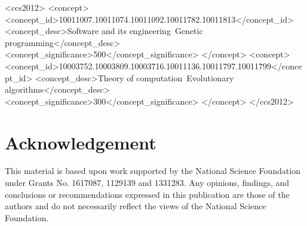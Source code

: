 \documentclass[sigconf]{acmart}
\begin{document}
%
%
\begin{CCSXML}
<ccs2012>
<concept>
<concept_id>10011007.10011074.10011092.10011782.10011813</concept_id>
<concept_desc>Software and its engineering~Genetic programming</concept_desc>
<concept_significance>500</concept_significance>
</concept>
<concept>
<concept_id>10003752.10003809.10003716.10011136.10011797.10011799</concept_id>
<concept_desc>Theory of computation~Evolutionary algorithms</concept_desc>
<concept_significance>300</concept_significance>
</concept>
</ccs2012>
\end{CCSXML}



\maketitle



\section{Acknowledgement}

This material is based upon work supported by the National Science Foundation under Grants No. 1617087, 1129139 and 1331283. Any opinions, findings, and conclusions or recommendations expressed in this publication are those of the authors and do not necessarily reflect the views of the National Science Foundation.

 

\end{document}

